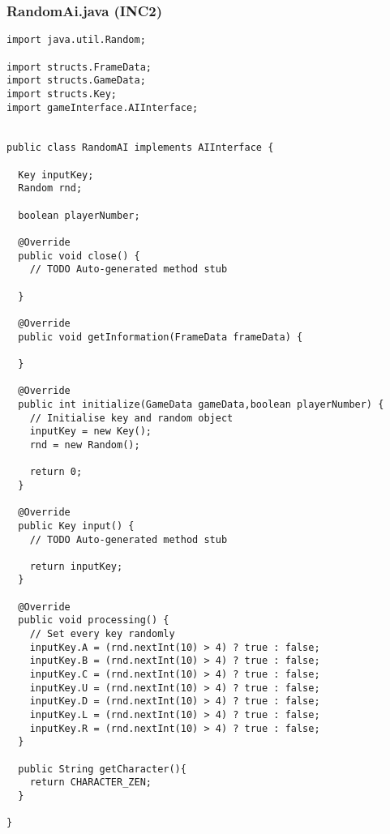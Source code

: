 \documentclass[12pt,a4paper]{article}
\begin{document}
\subsubsection{RandomAi.java (INC2)}
\begin{lstlisting}
import java.util.Random;

import structs.FrameData;
import structs.GameData;
import structs.Key;
import gameInterface.AIInterface;


public class RandomAI implements AIInterface {

  Key inputKey;
  Random rnd;
  
  boolean playerNumber;
  
  @Override
  public void close() {
    // TODO Auto-generated method stub

  }

  @Override
  public void getInformation(FrameData frameData) {
    
  }

  @Override
  public int initialize(GameData gameData,boolean playerNumber) {
    // Initialise key and random object
    inputKey = new Key();
    rnd = new Random();
    
    return 0;
  }

  @Override
  public Key input() {
    // TODO Auto-generated method stub
    
    return inputKey;
  }

  @Override
  public void processing() {
    // Set every key randomly
    inputKey.A = (rnd.nextInt(10) > 4) ? true : false;
    inputKey.B = (rnd.nextInt(10) > 4) ? true : false;
    inputKey.C = (rnd.nextInt(10) > 4) ? true : false;
    inputKey.U = (rnd.nextInt(10) > 4) ? true : false;
    inputKey.D = (rnd.nextInt(10) > 4) ? true : false;
    inputKey.L = (rnd.nextInt(10) > 4) ? true : false;
    inputKey.R = (rnd.nextInt(10) > 4) ? true : false;
  } 

  public String getCharacter(){
    return CHARACTER_ZEN;
  }
  
}
\end{lstlisting}
\end{document}
